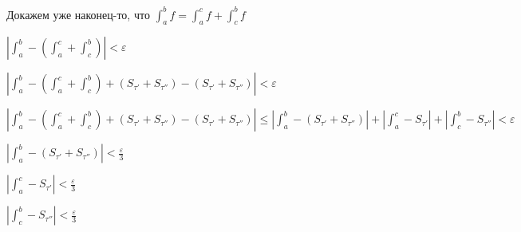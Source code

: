 \documentclass[a4paper]{article}
\begin{document}
\begin{definit}
Докажем уже наконец-то, что $\displaystyle \int_a^b f = \int_a^c f + \int_c^b f $

$\displaystyle \left| \int_a^b - \left( \int_a^c + \int_c^b \right) \right| < \varepsilon$

$\displaystyle \left| \int_a^b - \left( \int_a^c + \int_c^b \right) + \left( S_{\tau'} + S_{\tau''} \right) - (S_{\tau'} + S_{\tau''}) \right| < \varepsilon$

$\displaystyle \left| \int_a^b - \left( \int_a^c + \int_c^b \right) + \left( S_{\tau'} + S_{\tau''} \right) - (S_{\tau'} + S_{\tau''}) \right| \leq \left| \int_a^b -  (S_{\tau'} + S_{\tau''}) \right| + \left| \int_a^c - S_{\tau'} \right| + \left| \int_c^b - S_{\tau''} \right| <\varepsilon$

$\left| \int_a^b - ( S_{\tau'} + S_{\tau''}) \right| < \frac{\varepsilon}{3}$

$ \left| \int_a^c - S_{\tau'} \right| < \frac{\varepsilon}{3}$

$\left| \int_c^b - S_{\tau''} \right| < \frac{\varepsilon}{3}$

\end{definit}
\end{document}
